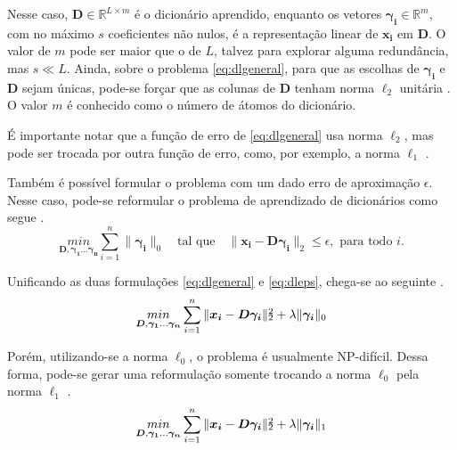 \documentclass[cic,tc]{iiufrgs}
\def\SPSB#1#2{\rlap{\textsuperscript{#1}}\SB{#2}}
\def\SB#1{\textsubscript{#1}}
\renewcommand{\vec}[1]{\bm{#1}}
\newcommand{\mat}[1]{\bm{#1}}
\begin{document}
Nesse caso, $\mat{D} \in \mathbb{R}^{L\times m}$ é o dicionário aprendido, enquanto os 
vetores $\vec{\gamma_i} \in \mathbb{R}^m$, com no máximo $s$ coeficientes não nulos, é a representação
linear de $\vec{x_i}$ em $\mat{D}$. O valor de $m$ pode ser maior que o de $L$, talvez para 
explorar alguma redundância, mas $s\ll L$. Ainda, sobre o problema \eqref{eq:dlgeneral}, para que as escolhas
de $\vec{\gamma_i}$ e $\mat{D}$ sejam únicas, pode-se forçar que as colunas de $\mat{D}$ tenham norma $\ell_2$
unitária \cite{chen2015compressed}. O valor $m$ é conhecido como o número de átomos do 
dicionário.

É importante notar que a função de erro de \eqref{eq:dlgeneral} usa norma $\ell_2$, mas pode ser trocada
por outra função de erro, como, por exemplo, a norma $\ell_1$ \cite{chen2015compressed}.

Também é possível formular o problema com um dado erro de aproximação $\epsilon$.
Nesse caso, pode-se reformular o problema de aprendizado de dicionários como segue \cite{chen2015compressed}.
\begin{equation}
    \label{eq:dleps}
    \underset{\mat{D}, \vec{\gamma_1}...\vec{\gamma_n}}{min} 
    \sum_{i=1}^{n} {\lVert \vec{\gamma_i} \rVert_0}
    \hspace{1em} \text{tal que} \hspace{1em}
    \lVert \vec{x_i} - \mat{D}\vec{\gamma_i} \rVert_2 \le \epsilon, \text{ para todo } i.
\end{equation}

Unificando as duas formulações \eqref{eq:dlgeneral} e \eqref{eq:dleps}, chega-se ao seguinte
\cite{chen2015compressed}.
\begin{equation}
    \label{eq:dlunica}
    \underset{\mat{D}, \vec{\gamma_1}...\vec{\gamma_n}}{min} 
    \sum_{i=1}^{n} {\lVert \vec{x_i} - \mat{D}\vec{\gamma_i} \rVert\SPSB{2}{2} + \lambda \lVert \vec{\gamma_i} \rVert_0}
\end{equation}

Porém, utilizando-se a norma $\ell_0$, o problema é usualmente NP-difícil. Dessa forma, pode-se gerar
uma reformulação somente trocando a norma $\ell_0$ pela norma $\ell_1$ \cite{chen2015compressed}.
\begin{equation}
    \label{eq:dlunical1}
    \underset{\mat{D}, \vec{\gamma_1}...\vec{\gamma_n}}{min} 
    \sum_{i=1}^{n} {\lVert \vec{x_i} - \mat{D}\vec{\gamma_i} \rVert\SPSB{2}{2} + \lambda \lVert \vec{\gamma_i} \rVert_1}
\end{equation}
\end{document}
